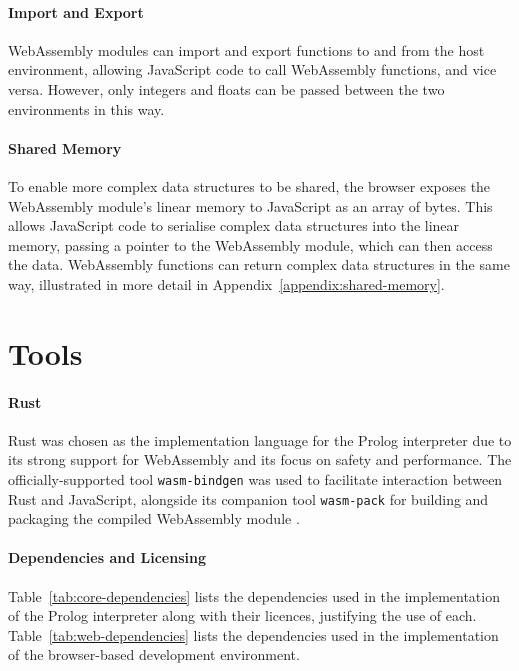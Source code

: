 \paragraph{Import and Export} WebAssembly modules can import and export functions to and from the host environment, allowing JavaScript code to call WebAssembly functions, and vice versa. However, only integers and floats can be passed between the two environments in this way.

\paragraph{Shared Memory} To enable more complex data structures to be shared, the browser exposes the WebAssembly module's linear memory to JavaScript as an array of bytes. This allows JavaScript code to serialise complex data structures into the linear memory, passing a pointer to the WebAssembly module, which can then access the data. WebAssembly functions can return complex data structures in the same way, illustrated in more detail in Appendix~\ref{appendix:shared-memory}.

\section{Tools}

\label{sec:tools}

\paragraph{Rust}

Rust was chosen as the implementation language for the Prolog interpreter due to its strong support for WebAssembly and its focus on safety and performance. The officially-supported tool \texttt{wasm-bindgen} was used to facilitate interaction between Rust and JavaScript, alongside its companion tool \texttt{wasm-pack} for building and packaging the compiled WebAssembly module \cite{crichtonwasmbindgenhttpsgithubcom2014}.

\paragraph{Dependencies and Licensing}

Table~\ref{tab:core-dependencies} lists the dependencies used in the implementation of the Prolog interpreter along with their licences, justifying the use of each. Table~\ref{tab:web-dependencies} lists the dependencies used in the implementation of the browser-based development environment.

